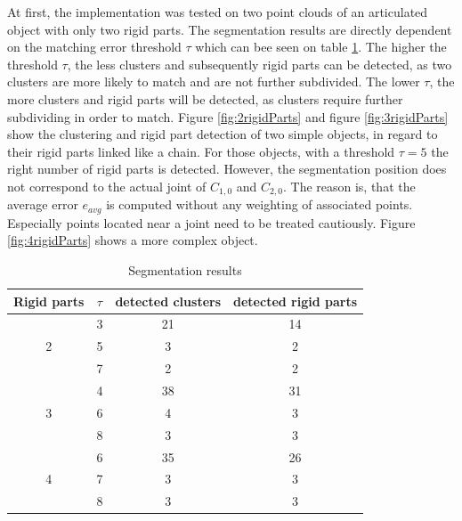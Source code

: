 \documentclass[notitlepage,english]{hgbreport}
\begin{document}
	At first, the implementation was tested on two point clouds of an articulated object with only two rigid parts. The segmentation results are directly dependent on the matching error threshold $\tau$ which can bee seen on table \ref{table:segmentation_results}. The higher the threshold $\tau$, the less clusters and subsequently rigid parts can be detected, as two clusters are more likely to match and are not further subdivided. The lower $\tau$, the more clusters and rigid parts will be detected, as clusters require further subdividing in order to match. Figure \ref{fig:2rigidParts} and figure \ref{fig:3rigidParts} show the clustering and rigid part detection of two simple objects, in regard to their rigid parts linked like a chain. For those objects, with a threshold $\tau = 5$ the right number of rigid parts is detected. However, the segmentation position does not correspond to the actual joint of $C_{1,0}$ and $C_{2,0}$. The reason is, that the average error $e_{avg}$ is computed without any weighting of associated points. Especially points located near a joint need to be treated cautiously. Figure \ref{fig:4rigidParts} shows a more complex object.
	
	\begin{table}
		\centering\small
		\begin{tabular}{ |c|c|c|c| } 
			\hline
			Rigid parts & $\tau$ & detected clusters & detected rigid parts \\
			\hline
			& 3 & 21 & 14 \\ 
			2& 5 & 3 & 2 \\
			& 7 & 2 & 2 \\
			\hline
			& 4 & 38 & 31 \\ 
			3 & 6 & 4 & 3 \\
			& 8 & 3 & 3 \\
			\hline
			& 6 & 35 & 26 \\ 
			4 & 7 & 3 & 3 \\
			& 8 & 3 & 3 \\
			\hline
		\end{tabular}
		\caption{Segmentation results}
		\label{table:segmentation_results}
	\end{table}
	
\end{document}
